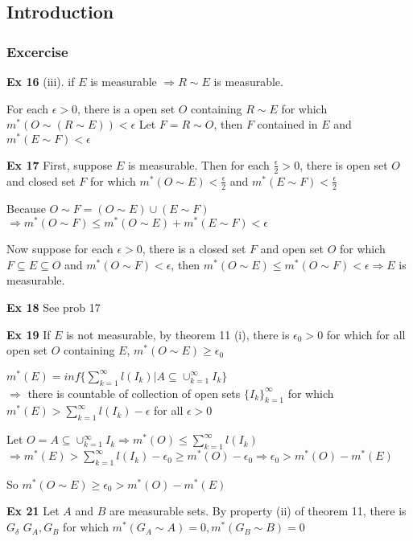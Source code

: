 \subsection{Introduction}
\subsubsection{Excercise}

\textbf{Ex 16}
(iii). if $E$ is measurable $\Rightarrow R \sim E$ is measurable.

For each $\epsilon > 0$, there is a open set $O$ containing $R \sim E$ for which $m^*(O \sim (R \sim E)) < \epsilon$
Let $F = R \sim O$, then $F$ contained in $E$ and $m^*(E \sim F) < \epsilon$

\textbf{Ex 17}
First, suppose $E$ is measurable. Then for each $\frac{\epsilon}{2} > 0$, there is open set $O$ and closed set $F$ for which $m^*(O \sim E) < \frac{\epsilon}{2}$ and $m^*(E \sim F) < \frac{\epsilon}{2}$

Because $O \sim F = (O\sim E) \cup (E \sim F)$
$\Rightarrow m^*(O \sim F) \leq m^*(O \sim E) + m^*(E \sim F) < \epsilon$

Now suppose for each $\epsilon > 0$, there is a closed set $F$ and open set $O$ for which $F \subseteq E \subseteq O$ and $m^*(O \sim F) < \epsilon$, then $m^*(O \sim E) \leq m^*(O \sim F) < \epsilon \Rightarrow E$ is measurable.

\textbf{Ex 18}
See prob 17

\textbf{Ex 19}
If $E$ is not measurable, by theorem 11 (i), there is $\epsilon_0 > 0$ for which for all open set $O$ containing $E$, $m^*(O \sim E) \geq \epsilon_0$

$m^*(E) = inf\{\sum_{k=1}^{\infty}l(I_k) | A \subseteq \cup_{k = 1}^{\infty}I_k\}$\\
$ \Rightarrow$ there is countable of collection of open sets $\{I_k\}_{k=1}^{\infty}$ for which $m^*(E) > \sum_{k=1}^{\infty}l(I_k) - \epsilon$ for all $\epsilon > 0$

Let $O = A \subseteq \cup_{k = 1}^{\infty}I_k \Rightarrow m^*(O) \leq \sum_{k=1}^{\infty}l(I_k)$\\
$\Rightarrow m^*(E) > \sum_{k=1}^{\infty}l(I_k) - \epsilon_0 \geq m^*(O) - \epsilon_0 \Rightarrow \epsilon_0 > m^*(O) - m^*(E)$

So $m^*(O \sim E) \geq \epsilon_0 > m^*(O) - m^*(E)$

\textbf{Ex 21}
Let $A$ and $B$ are measurable sets. By property (ii) of theorem 11, there is $G_{\delta}$ $G_A, G_B$ for which $m^*(G_A \sim A) = 0, m^*(G_B \sim B) = 0$

